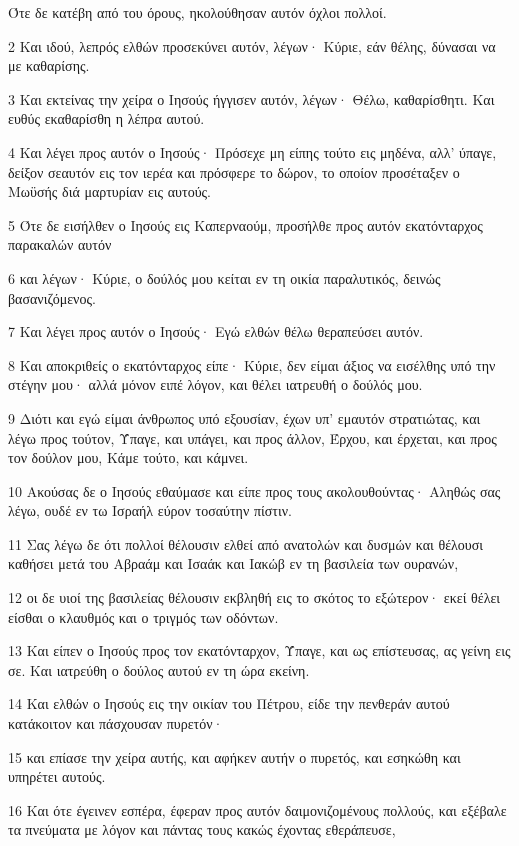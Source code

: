 \par Ότε δε κατέβη από του όρους, ηκολούθησαν αυτόν όχλοι πολλοί.
\par 2 Και ιδού, λεπρός ελθών προσεκύνει αυτόν, λέγων· Κύριε, εάν θέλης, δύνασαι να με καθαρίσης.
\par 3 Και εκτείνας την χείρα ο Ιησούς ήγγισεν αυτόν, λέγων· Θέλω, καθαρίσθητι. Και ευθύς εκαθαρίσθη η λέπρα αυτού.
\par 4 Και λέγει προς αυτόν ο Ιησούς· Πρόσεχε μη είπης τούτο εις μηδένα, αλλ' ύπαγε, δείξον σεαυτόν εις τον ιερέα και πρόσφερε το δώρον, το οποίον προσέταξεν ο Μωϋσής διά μαρτυρίαν εις αυτούς.
\par 5 Ότε δε εισήλθεν ο Ιησούς εις Καπερναούμ, προσήλθε προς αυτόν εκατόνταρχος παρακαλών αυτόν
\par 6 και λέγων· Κύριε, ο δούλός μου κείται εν τη οικία παραλυτικός, δεινώς βασανιζόμενος.
\par 7 Και λέγει προς αυτόν ο Ιησούς· Εγώ ελθών θέλω θεραπεύσει αυτόν.
\par 8 Και αποκριθείς ο εκατόνταρχος είπε· Κύριε, δεν είμαι άξιος να εισέλθης υπό την στέγην μου· αλλά μόνον ειπέ λόγον, και θέλει ιατρευθή ο δούλός μου.
\par 9 Διότι και εγώ είμαι άνθρωπος υπό εξουσίαν, έχων υπ' εμαυτόν στρατιώτας, και λέγω προς τούτον, Ύπαγε, και υπάγει, και προς άλλον, Έρχου, και έρχεται, και προς τον δούλον μου, Κάμε τούτο, και κάμνει.
\par 10 Ακούσας δε ο Ιησούς εθαύμασε και είπε προς τους ακολουθούντας· Αληθώς σας λέγω, ουδέ εν τω Ισραήλ εύρον τοσαύτην πίστιν.
\par 11 Σας λέγω δε ότι πολλοί θέλουσιν ελθεί από ανατολών και δυσμών και θέλουσι καθήσει μετά του Αβραάμ και Ισαάκ και Ιακώβ εν τη βασιλεία των ουρανών,
\par 12 οι δε υιοί της βασιλείας θέλουσιν εκβληθή εις το σκότος το εξώτερον· εκεί θέλει είσθαι ο κλαυθμός και ο τριγμός των οδόντων.
\par 13 Και είπεν ο Ιησούς προς τον εκατόνταρχον, Ύπαγε, και ως επίστευσας, ας γείνη εις σε. Και ιατρεύθη ο δούλος αυτού εν τη ώρα εκείνη.
\par 14 Και ελθών ο Ιησούς εις την οικίαν του Πέτρου, είδε την πενθεράν αυτού κατάκοιτον και πάσχουσαν πυρετόν·
\par 15 και επίασε την χείρα αυτής, και αφήκεν αυτήν ο πυρετός, και εσηκώθη και υπηρέτει αυτούς.
\par 16 Και ότε έγεινεν εσπέρα, έφεραν προς αυτόν δαιμονιζομένους πολλούς, και εξέβαλε τα πνεύματα με λόγον και πάντας τους κακώς έχοντας εθεράπευσε,
